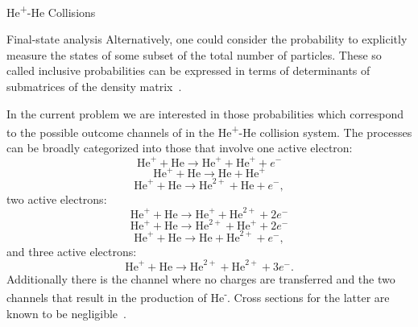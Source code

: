 \documentclass[letterpaper, 11 pt]{report}
\begin{document}
\begin{chapter}{\texorpdfstring{He\textsuperscript{+}}{He+}-He Collisions \label{chap:hephe}}
\begin{section}{Final-state analysis \label{sec:hephe-det}}
      Alternatively, one could consider the probability to explicitly measure the states of some subset
      of the total number of particles. These so called inclusive probabilities can be expressed in
      terms of determinants of submatrices of the density matrix~\cite{inc-prob}.

      In the current problem we are interested in those probabilities which correspond to the possible
      outcome channels of in the He\textsuperscript{+}-He collision system. The processes can be broadly
      categorized into those that involve one active electron:
      \begin{equation} \label{eq:tpi111}
         \mathrm{He}^+ + \mathrm{He} \rightarrow \mathrm{He}^+ + \mathrm{He}^+ + e^-
      \end{equation}
      \begin{equation} \label{eq:tpi120}
         \mathrm{He}^+ + \mathrm{He} \rightarrow \mathrm{He} + \mathrm{He}^+
      \end{equation}
      \begin{equation} \label{eq:tpi201}
         \mathrm{He}^+ + \mathrm{He} \rightarrow \mathrm{He}^{2+} + \mathrm{He} + e^-,
      \end{equation}
      two active electrons:
      \begin{equation} \label{eq:tpi012}
         \mathrm{He}^+ + \mathrm{He} \rightarrow \mathrm{He}^+ + \mathrm{He}^{2+} + 2e^-
      \end{equation}
      \begin{equation} \label{eq:tpi102}
         \mathrm{He}^+ + \mathrm{He} \rightarrow \mathrm{He}^{2+} + \mathrm{He}^+ + 2e^-
      \end{equation}
      \begin{equation} \label{eq:tpi021}
         \mathrm{He}^+ + \mathrm{He} \rightarrow \mathrm{He} + \mathrm{He}^{2+} + e^-,
      \end{equation}
      and three active electrons:
      \begin{equation} \label{eq:tpi003}
         \mathrm{He}^+ + \mathrm{He} \rightarrow \mathrm{He}^{2+} + \mathrm{He}^{2+} + 3e^{-}.
      \end{equation}
      Additionally there is the channel where no charges are transferred and the two channels that result
      in the production of He\textsuperscript{-}. Cross sections for the latter are known to be
      negligible~\cite{metahe, neghe-neg}.


\end{section}
\end{chapter}
\end{document}
